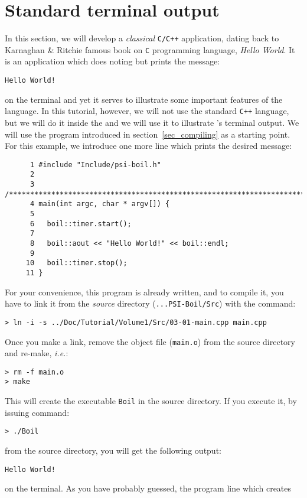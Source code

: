 \section{Standard terminal output}
\label{sec_standard}

In this section, we will develop a {\em classical} {\tt C/C++} application,
dating back to Karnaghan \& Ritchie famous book on {\tt C} programming 
language, {\em Hello World}. It is an application which does noting but
prints the message:
%
{\small \begin{verbatim}
Hello World!
\end{verbatim}}
%
on the terminal and yet it serves to illustrate some important features
of the language. In this tutorial, however, we will not use the standard
{\tt C++} language, but we will do it inside the {\psiboil} and we
will use it to illustrate {\psiboil}'s terminal output. We will 
use the program introduced in section~\ref{sec_compiling} as a starting
point. For this example, we introduce one more line which prints the desired 
message:
%
{\small \begin{verbatim}
      1 #include "Include/psi-boil.h"
      2
      3 /****************************************************************************/
      4 main(int argc, char * argv[]) {
      5
      6   boil::timer.start();
      7
      8   boil::aout << "Hello World!" << boil::endl;
      9
     10   boil::timer.stop();
     11 }
\end{verbatim}}
%
For your convenience, this program is already written, and to compile it,
you have to link it from the {\em source} directory ({\tt ...PSI-Boil/Src})
with the command:
%
\begin{verbatim}
> ln -i -s ../Doc/Tutorial/Volume1/Src/03-01-main.cpp main.cpp
\end{verbatim}
%
Once you make a link, remove the object file ({\tt main.o}) from the source
directory and re-make, {\em i.e.}:
%
\begin{verbatim}
> rm -f main.o
> make
\end{verbatim}
%
This will create the executable {\tt Boil} in the source directory. If you 
execute it, by issuing command:
%
\begin{verbatim}
> ./Boil
\end{verbatim}
%
from the source directory, you will get the following output:
%
{\small \begin{verbatim}
Hello World!
\end{verbatim}}
%
on the terminal. As you have probably guessed, the program line which creates 
